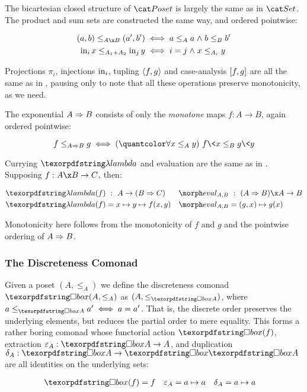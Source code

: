 The bicartesian closed structure of $\Poset$ is largely the same as in $\Set$.
%
The product and sum sets are constructed the same way, and ordered pointwise:

\begin{align*}
  (a,b) \le_{A \x B} (a',b') &\iff a \le_A a \wedge b \le_B b'\\
  \inj i x \le_{A_1 + A_2} \inj j y &\iff i = j \wedge x \le_{A_i} y
\end{align*}

\noindent Projections $\pi_i$, injections $\mathrm{in}_i$, tupling $\langle{f,g}\rangle$ and
case-analysis $[{f,g}]$ are all the same as in \Set, pausing only to note
that all these operations preserve monotonicity, as we need.

The exponential $A \Rightarrow B$ consists of only the \emph{monotone} maps $f : A \to
B$, again ordered pointwise:

\[ f \le_{\expO A B} g \iff \fa{x \le_A y} f\<x \le_B g\<y \]

\noindent
Currying $\fn$ and evaluation are the same as in \Set. Supposing $f : A \x B \to
C$, then:

\begin{align*}
  \fn(f) &\isa A \to (\expO B C) &
  \eval_{A,B} &\isa (\expO A B) \x A \to B
  \\
  \fn(f) &= x \mapsto y \mapsto f(x,y) &
  \eval_{A,B} &= (g,x) \mapsto g(x)
\end{align*}

\noindent
Monotonicity here follows from the monotonicity of $f$ and $g$ and the pointwise ordering of $A \Rightarrow B$.


\subsubsection{The Discreteness Comonad}

Given a poset $(A, \leq_A)$ we define the discreteness comonad $\iso(A, \leq_A)$
as $(A, \leq_{\iso A})$, where \( a \leq_{\iso A} a' \iff a = a' \).
%
That is, the discrete order preserves the underlying elements, but reduces the
partial order to mere equality.
%
This forms a rather boring comonad whose functorial action $\iso(f)$, extraction $\varepsilon_A : \iso A \to A$, and duplication $\delta_A : \iso A \to \iso \iso A$ are all identities on the underlying sets:

\nopagebreak[2]
\begin{align*}
  \iso(f) &= f & \varepsilon_A &= a \mapsto a & \delta_A &= a \mapsto a
\end{align*}

